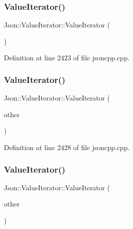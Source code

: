 \subsubsection{\texorpdfstring{Value\+Iterator()}{ValueIterator()}\hspace{0.1cm}{\footnotesize\ttfamily [1/8]}}
{\footnotesize\ttfamily Json\+::\+Value\+Iterator\+::\+Value\+Iterator (\begin{DoxyParamCaption}{ }\end{DoxyParamCaption})}



Definition at line 2423 of file jsoncpp.\+cpp.

\hypertarget{class_json_1_1_value_iterator_aa85aa208670891670392259efa0143bb}{}\label{class_json_1_1_value_iterator_aa85aa208670891670392259efa0143bb} 
\subsubsection{\texorpdfstring{Value\+Iterator()}{ValueIterator()}\hspace{0.1cm}{\footnotesize\ttfamily [2/8]}}
{\footnotesize\ttfamily Json\+::\+Value\+Iterator\+::\+Value\+Iterator (\begin{DoxyParamCaption}\item[{const \hyperlink{class_json_1_1_value_const_iterator}{Value\+Const\+Iterator} \&}]{other }\end{DoxyParamCaption})\hspace{0.3cm}{\ttfamily [explicit]}}



Definition at line 2428 of file jsoncpp.\+cpp.

\hypertarget{class_json_1_1_value_iterator_a7d5e58a9a4a553968acdf3064b39d21c}{}\label{class_json_1_1_value_iterator_a7d5e58a9a4a553968acdf3064b39d21c} 
\subsubsection{\texorpdfstring{Value\+Iterator()}{ValueIterator()}\hspace{0.1cm}{\footnotesize\ttfamily [3/8]}}
{\footnotesize\ttfamily Json\+::\+Value\+Iterator\+::\+Value\+Iterator (\begin{DoxyParamCaption}\item[{const \hyperlink{class_json_1_1_value_iterator}{Value\+Iterator} \&}]{other }\end{DoxyParamCaption})}



